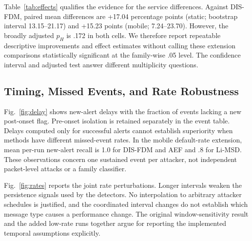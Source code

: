 \begin{table}[t]
\caption{Default-rate extension (seven attackers, seeds 21--30): means on $[0,1]$, except ARI, which is a reference-normalized service ratio.}\label{tab:extension}
\centering\footnotesize
\end{table}
\begin{table}[t]
\caption{AEF-learning minus comparator downward-PDR differences in the same extension cells. Bootstrap intervals are unadjusted; $p_H$ uses the full rate-experiment Holm family.}\label{tab:effects}
\centering\footnotesize
\end{table}

Table~\ref{tab:effects} qualifies the evidence for the service differences. Against DIS-FDM, paired mean differences are +17.04 percentage points (static; bootstrap interval 13.15--21.17) and +15.23 points (mobile; 7.24--23.70). However, the broadly adjusted $p_H$ is .172 in both cells. We therefore report repeatable descriptive improvements and effect estimates without calling these extension comparisons statistically significant at the family-wise .05 level. The confidence interval and adjusted test answer different multiplicity questions.

\subsection{Timing, Missed Events, and Rate Robustness}
Fig.~\ref{fig:delay} shows new-alert delays with the fraction of events lacking a new post-onset flag. Pre-onset isolation is retained separately in the event table. Delays computed only for successful alerts cannot establish superiority when methods have different missed-event rates. In the mobile default-rate extension, mean per-run new-alert recall is 1.0 for DIS-FDM and AEF and .8 for Li-MSD. These observations concern one sustained event per attacker, not independent packet-level attacks or a family classifier.

Fig.~\ref{fig:rates} reports the joint rate perturbations. Longer intervals weaken the persistence signals used by the detectors. No interpolation to arbitrary attacker schedules is justified, and the coordinated interval changes do not establish which message type causes a performance change. The original window-sensitivity result and the added low-rate runs together argue for reporting the implemented temporal assumptions explicitly.

